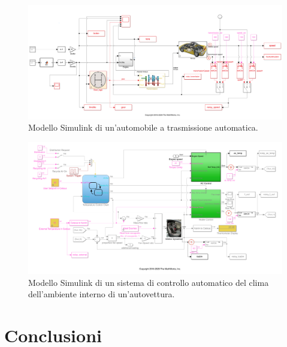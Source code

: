 \documentclass[Lau,binding=0.6cm]{sapthesis}
\begin{document}
\begin{figure}
    \includegraphics[scale=0.38]{car.png}
    \centering
    \caption{Modello Simulink di un'automobile a trasmissione automatica.}
    \label{fig:1}
\end{figure}

\begin{figure}
    \includegraphics[scale=0.45]{climate.png}
    \centering
    \caption{Modello Simulink di un sistema di controllo automatico del clima dell'ambiente interno di un'autovettura.}
    \label{fig:2}
\end{figure}

\chapter{Conclusioni}


\backmatter
\end{document}
